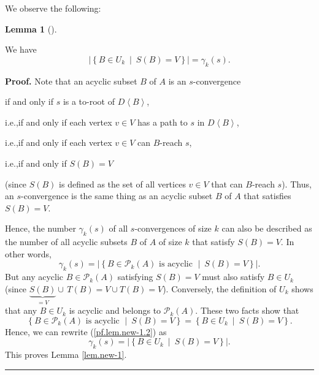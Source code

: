 \documentclass[numbers=enddot,12pt,final,onecolumn,notitlepage]{scrartcl}%
\theoremstyle{definition}
\newtheorem{lem}[theo]{Lemma}
\newenvironment{lemma}[1][]
{\begin{lem}[#1]\begin{leftbar}}
{\end{leftbar}\end{lem}}
\newenvironment{proof}[1][Proof]{\noindent\textbf{#1.} }{\ \rule{0.5em}{0.5em}}
\theoremstyle{plainsl}
\begin{document}
We observe the following:

\begin{lemma}
\label{lem.new-1}We have%
\[
\left\vert \left\{  B\in U_{k}\ \mid\ S\left(  B\right)  =V\right\}
\right\vert =\gamma_{k}\left(  s\right)  .
\]

\end{lemma}

\begin{proof}
Note that an acyclic subset $B$ of $A$ is an $s$-convergence

\qquad\qquad if and only if $s$ is a to-root of $D\left\langle B\right\rangle
$,

\qquad i.e.,\quad if and only if each vertex $v\in V$ has a path to $s$ in
$D\left\langle B\right\rangle $,

\qquad i.e.,\quad if and only if each vertex $v\in V$ can $B$-reach $s$,

\qquad i.e.,\quad if and only if $S\left(  B\right)  =V$

\noindent(since $S\left(  B\right)  $ is defined as the set of all vertices
$v\in V$ that can $B$-reach $s$). Thus, an $s$-convergence is the same thing
as an acyclic subset $B$ of $A$ that satisfies $S\left(  B\right)  =V$.

Hence, the number $\gamma_{k}\left(  s\right)  $ of all $s$-convergences of
size $k$ can also be described as the number of all acyclic subsets $B$ of $A$
of size $k$ that satisfy $S\left(  B\right)  =V$. In other words,%
\begin{equation}
\gamma_{k}\left(  s\right)  =\left\vert \left\{  B\in\mathcal{P}_{k}\left(
A\right)  \text{ is acyclic }\mid\ S\left(  B\right)  =V\right\}  \right\vert
. \label{pf.lem.new-1.2}%
\end{equation}
But any acyclic $B\in\mathcal{P}_{k}\left(  A\right)  $ satisfying $S\left(
B\right)  =V$ must also satisfy $B\in U_{k}$ (since $\underbrace{S\left(
B\right)  }_{=V}\cup\,T\left(  B\right)  =V\cup T\left(  B\right)  =V$).
Conversely, the definition of $U_{k}$ shows that any $B\in U_{k}$ is acyclic
and belongs to $\mathcal{P}_{k}\left(  A\right)  $. These two facts show that%
\[
\left\{  B\in\mathcal{P}_{k}\left(  A\right)  \text{ is acyclic }%
\mid\ S\left(  B\right)  =V\right\}  =\left\{  B\in U_{k}\ \mid\ S\left(
B\right)  =V\right\}  .
\]
Hence, we can rewrite (\ref{pf.lem.new-1.2}) as
\[
\gamma_{k}\left(  s\right)  =\left\vert \left\{  B\in U_{k}\ \mid\ S\left(
B\right)  =V\right\}  \right\vert .
\]
This proves Lemma \ref{lem.new-1}.
\end{proof}
\end{document}
